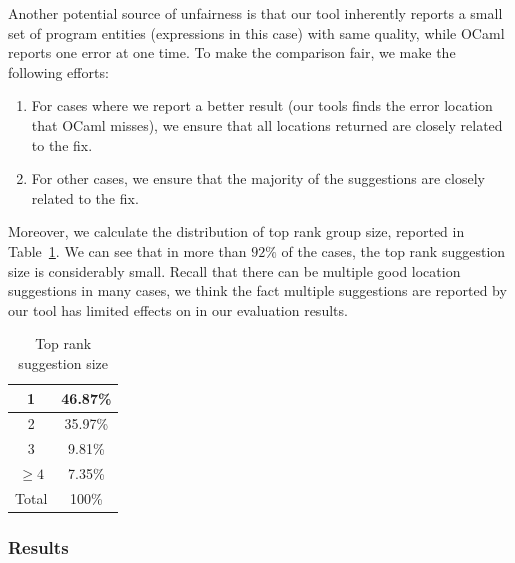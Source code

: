 Another potential source of unfairness is that our tool inherently
reports a small set of program entities (expressions in this case)
with same quality, while OCaml reports one error at one time. To make
the comparison fair, we make the following efforts:
\begin{enumerate}
\item For cases where we report a better result (our tools finds the
error location that OCaml misses), we ensure that all locations
returned are closely related to the fix.

\item For other cases, we ensure that the majority of the suggestions
are closely related to the fix. 
\end{enumerate}

Moreover, we calculate the distribution of top rank group size,
reported in Table~\ref{table:groupsize}. We can see that in more than
$92\%$ of the cases, the top rank suggestion size is considerably
small. Recall that there can be multiple good location suggestions in
many cases, we think the fact multiple suggestions are reported by our
tool has limited effects on in our evaluation results.

\begin{table}
\centering
\begin{tabular}{|c | c|}
\hline
1 & 46.87\% \\
\hline
2 & 35.97\% \\
\hline
3 & 9.81\% \\
\hline
$\geq 4$ & 7.35\% \\
\hline
Total & 100\% \\
\hline
\end{tabular}
\caption{Top rank suggestion size}
\label{table:groupsize}
\end{table}

\subsubsection{Results}

